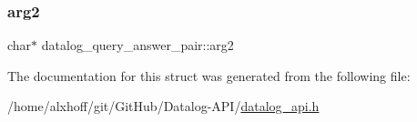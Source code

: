 \subsubsection{\texorpdfstring{arg2}{arg2}}
{\footnotesize\ttfamily char$\ast$ datalog\+\_\+query\+\_\+answer\+\_\+pair\+::arg2}



The documentation for this struct was generated from the following file\+:\begin{DoxyCompactItemize}
\item 
/home/alxhoff/git/\+Git\+Hub/\+Datalog-\/\+A\+P\+I/\hyperlink{datalog__api_8h}{datalog\+\_\+api.\+h}\end{DoxyCompactItemize}
